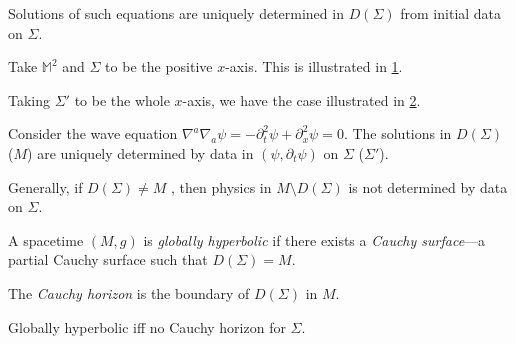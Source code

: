 Solutions of such equations are uniquely determined in $D(\Sigma)$  from initial data on $\Sigma$.
 \begin{example}[]
   Take $\mathbb{M}^2$  and $\Sigma$  to be the positive $x$-axis. This is illustrated in \ref{fig:l6f5}.
   \begin{figure}[tbhp]
     \centering
     \def\svgwidth{0.4\columnwidth}
     
     \caption{}
     \label{fig:l6f5}
   \end{figure}
   \begin{figure}[tbhp]
     \centering
     \def\svgwidth{0.4\columnwidth}
     
     \caption{}
     \label{fig:l6f6}
   \end{figure}
   Taking $\Sigma'$ to be the whole $x$-axis, we have the case illustrated in \ref{fig:l6f6}.

  Consider the wave equation $\nabla^{a} \nabla_{a} \psi = -\partial_t^2 \psi + \partial_x^2 \psi = 0$.
  The solutions in $D(\Sigma)$ ($M$) are uniquely determined by data in $(\psi, \partial_t \psi)$ on $\Sigma$ ($\Sigma'$).
\end{example}

Generally, if $D(\Sigma) \neq M$ , then physics in $M \setminus D(\Sigma)$  is not determined by data on $\Sigma$.

 \begin{definition}[]
   A spacetime $(M, g)$ is \emph{globally hyperbolic} if there exists a \emph{Cauchy surface}---a partial Cauchy surface such that $D(\Sigma) = M$.
\end{definition}
\begin{definition}[]
  The \emph{Cauchy horizon} is the boundary of $D(\Sigma)$ in $M$.
\end{definition}

Globally hyperbolic iff no Cauchy horizon for $\Sigma$.
